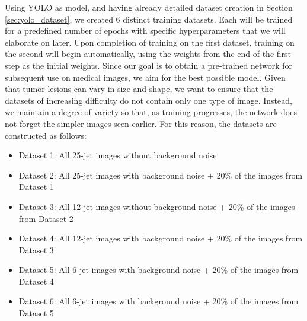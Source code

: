 Using YOLO as model, and having already detailed dataset creation in Section \ref{sec:yolo_dataset}, we created 6 distinct training datasets. Each will be trained for a predefined number of epochs with specific hyperparameters that we will elaborate on later. Upon completion of training on the first dataset, training on the second will begin automatically, using the weights from the end of the first step as the initial weights.
Since our goal is to obtain a pre-trained network for subsequent use on medical images, we aim for the best possible model. Given that tumor lesions can vary in size and shape, we want to ensure that the datasets of increasing difficulty do not contain only one type of image. Instead, we maintain a degree of variety so that, as training progresses, the network does not forget the simpler images seen earlier.
For this reason, the datasets are constructed as follows:
\begin{itemize}
\item Dataset 1: All 25-jet images without background noise
\item Dataset 2: All 25-jet images with background noise + 20$\%$ of the images from Dataset 1
\item Dataset 3: All 12-jet images without background noise + 20$\%$ of the images from Dataset 2
\item Dataset 4: All 12-jet images with background noise + 20$\%$ of the images from Dataset 3
\item Dataset 5: All 6-jet images with background noise + 20$\%$ of the images from Dataset 4
\item Dataset 6: All 6-jet images with background noise + 20$\%$ of the images from Dataset 5
\end{itemize}

